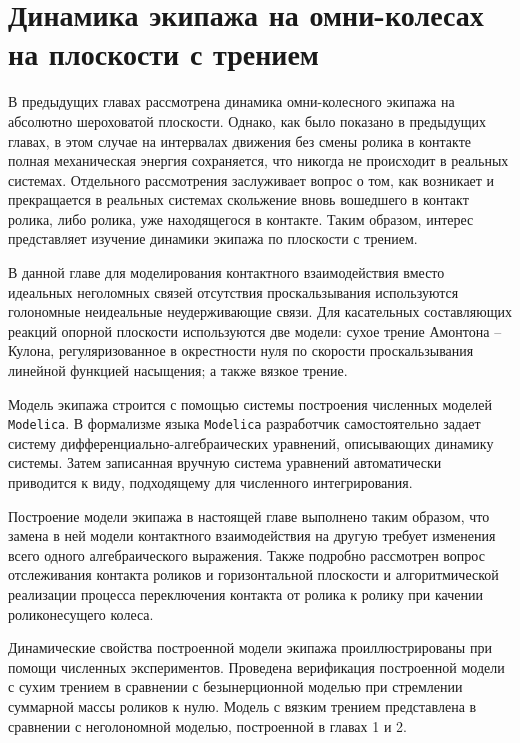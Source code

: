 \chapter{Динамика экипажа на омни-колесах на плоскости с трением}


В предыдущих главах рассмотрена динамика омни-колесного экипажа на абсолютно шероховатой плоскости. Однако, как было показано в предыдущих главах, в этом случае на интервалах движения без смены ролика в контакте полная механическая энергия сохраняется, что никогда не происходит в реальных системах.
Отдельного рассмотрения заслуживает вопрос о том, как возникает и прекращается в реальных системах скольжение вновь вошедшего в контакт ролика, либо ролика, уже находящегося в контакте.
Таким образом, интерес представляет изучение динамики экипажа по плоскости с трением.

В данной главе для моделирования контактного взаимодействия вместо идеальных неголомных связей отсутствия проскальзывания используются голономные неидеальные неудерживающие связи. Для касательных составляющих реакций опорной плоскости используются две модели: сухое трение Амонтона -- Кулона, регуляризованное в окрестности нуля по скорости проскальзывания линейной функцией насыщения; а также вязкое трение.

Модель экипажа строится с помощью системы построения численных моделей \texttt{Modelica}. В формализме языка \texttt{Modelica} разработчик самостоятельно задает систему дифференциально-алгебраических уравнений, описывающих динамику системы. Затем записанная вручную система уравнений автоматически приводится к виду, подходящему для численного интегрирования.

Построение модели экипажа в настоящей главе выполнено таким образом, что замена в ней модели контактного взаимодействия на другую требует изменения всего одного алгебраического выражения. Также подробно рассмотрен вопрос отслеживания контакта роликов и горизонтальной плоскости и алгоритмической реализации процесса переключения контакта от ролика к ролику при качении  роликонесущего колеса.

Динамические свойства построенной модели экипажа проиллюстрированы при помощи численных экспериментов. Проведена верификация построенной модели с сухим трением в сравнении с безынерционной моделью при стремлении суммарной массы роликов к нулю. Модель с вязким трением представлена в сравнении с неголономной моделью, построенной в главах 1 и 2.